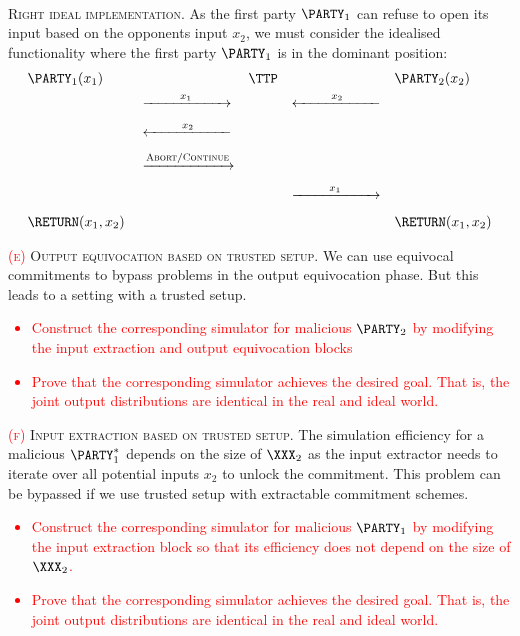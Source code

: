 \documentclass{crypto-exercise}
\begin{document}
\begin{solution}
\ \\
\textsc{Right ideal implementation.}
As the first party $\PARTY_1$ can refuse to open its input based on the opponents input $x_2$, we must consider the  idealised functionality where the first party $\PARTY_1$ is in the dominant position:
\begin{align*}
&\PARTY_1(x_1) &&&& \TTP  &&&&\PARTY_2(x_2) \\
&&&\xrightarrow[\hspace*{2cm}]{x_1}
&&&\xleftarrow[\hspace*{2cm}]{x_2}\\
&&&\xleftarrow[\hspace*{2cm}]{x_2}\\
&&&\xrightarrow[\hspace*{2cm}]{\textsc{Abort}/\textsc{Continue}}\\
&&&&&&\xrightarrow[\hspace*{2cm}]{x_1}\\
&\RETURN (x_1,x_2)
&&&&&&&&\RETURN (x_1,x_2)
\end{align*}


\noindent
\textsc{\textcolor{red}{(e)} Output equivocation based on trusted setup.} 
We can use equivocal commitments to bypass problems in the output equivocation phase. But this leads to a setting with a trusted setup. 

\medskip
\noindent
\textcolor{red}{
\begin{itemize}
\item Construct the corresponding simulator for malicious $\PARTY_2$ by modifying the input extraction and output equivocation blocks
\item Prove that the corresponding simulator achieves the desired goal. That is, the joint output distributions are identical in the real and ideal world.   
\end{itemize}
}

\noindent
\textsc{\textcolor{red}{(f)} Input extraction based on trusted setup.} 
The simulation efficiency for a malicious $\PARTY_1^*$ depends on the size of $\XXX_2$ as the input extractor needs to iterate over all potential inputs $x_2$ to unlock the commitment. This problem can be bypassed if we use trusted setup with extractable commitment schemes.

\medskip
\noindent
\textcolor{red}{
\begin{itemize}
\item Construct the corresponding simulator for malicious $\PARTY_1$ by modifying the input extraction block so that its efficiency does not depend on the size of $\XXX_2$.
\item Prove that the corresponding simulator achieves the desired goal. That is, the joint output distributions are identical in the real and ideal world.   
\end{itemize}
}


\end{solution}
\end{document}
